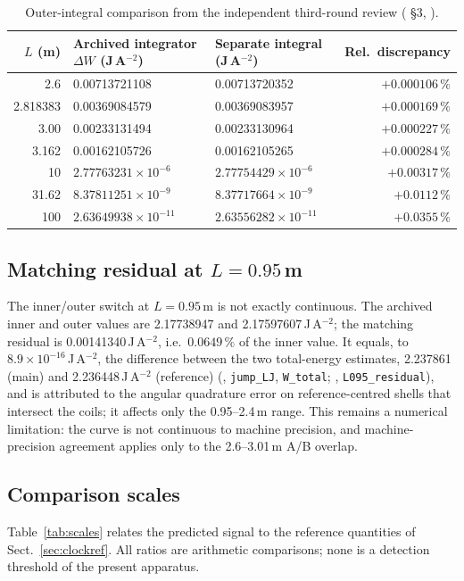 \documentclass[12pt,a4paper]{article}
\newcommand{\e}[1]{\times10^{#1}}
\newcommand{\filec}[1]{\texttt{\detokenize{#1}}}
\begin{document}
\begin{table}[t]
\centering
\caption{Outer-integral comparison from the independent third-round review
(\filec{revision3_review_EN.md} \S3, \cite{TAL_V20}).}
\label{tab:outer}
\small
\begin{tabular}{rllr}
\toprule
$L$ (m) & Archived integrator $\Delta W$ (J\,A$^{-2}$) & Separate integral (J\,A$^{-2}$) & Rel.\ discrepancy\\
\midrule
2.6      & 0.00713721108 & 0.00713720352 & $+0.000106\,\%$\\
2.818383 & 0.00369084579 & 0.00369083957 & $+0.000169\,\%$\\
3.00     & 0.00233131494 & 0.00233130964 & $+0.000227\,\%$\\
3.162    & 0.00162105726 & 0.00162105265 & $+0.000284\,\%$\\
10       & $2.77763231\e{-6}$ & $2.77754429\e{-6}$ & $+0.00317\,\%$\\
31.62    & $8.37811251\e{-9}$ & $8.37717664\e{-9}$ & $+0.0112\,\%$\\
100      & $2.63649938\e{-11}$ & $2.63556282\e{-11}$ & $+0.0355\,\%$\\
\bottomrule
\end{tabular}
\end{table}

\subsection{\texorpdfstring{Matching residual at $L=0.95$\,m}{Matching residual at L = 0.95 m}}\label{sec:L095}
The inner/outer switch at $L=0.95$\,m is not exactly continuous. The archived inner and outer values are
2.17738947 and 2.17597607\,J\,A$^{-2}$; the matching residual is 0.00141340\,J\,A$^{-2}$, i.e.\ $0.0649\,\%$ of the
inner value. It equals, to $8.9\times10^{-16}$\,J\,A$^{-2}$, the difference between the two total-energy estimates,
2.237861 (main) and 2.236448\,J\,A$^{-2}$ (reference) (, \texttt{jump\_LJ},
\texttt{W\_total}; , \texttt{L095\_residual}), and is attributed to the angular
quadrature error on reference-centred shells that intersect the coils; it affects only the 0.95--2.4\,m range. This
remains a numerical limitation: the curve is not continuous to machine precision, and machine-precision agreement
applies only to the 2.6--3.01\,m A/B overlap.

\subsection{Comparison scales}
Table~\ref{tab:scales} relates the predicted signal to the reference quantities of Sect.~\ref{sec:clockref}. All
ratios are arithmetic comparisons; none is a detection threshold of the present apparatus.
\end{document}
